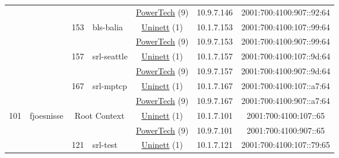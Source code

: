 \begin{small}
\begin{center}
\begin{longtable}{|c|c|c|c|c|c|c|c|}
  &  &  &  & \multicolumn{2}{|c|}{\tiny{\href{http://www.powertech.no}{PowerTech} (9)}} & \tiny{10.9.7.146} & \tiny{2001:700:4100:907::92:64} \\* \cline{3-3}\cline{4-4}\cline{5-5}\cline{6-6}\cline{7-7}\cline{8-8}
  &  & \multirow{2}{*}{\tiny{153}} & \multicolumn{1}{|l|}{\multirow{2}{*}{\tiny{bls-balia}}} & \multicolumn{2}{|c|}{\tiny{\href{https://www.uninett.no}{Uninett} (1)}} & \tiny{10.1.7.153} & \tiny{2001:700:4100:107::99:64} \\* \cline{5-5}\cline{6-6}\cline{7-7}\cline{8-8}
  &  &  &  & \multicolumn{2}{|c|}{\tiny{\href{http://www.powertech.no}{PowerTech} (9)}} & \tiny{10.9.7.153} & \tiny{2001:700:4100:907::99:64} \\* \cline{3-3}\cline{4-4}\cline{5-5}\cline{6-6}\cline{7-7}\cline{8-8}
  &  & \multirow{2}{*}{\tiny{157}} & \multicolumn{1}{|l|}{\multirow{2}{*}{\tiny{srl-seattle}}} & \multicolumn{2}{|c|}{\tiny{\href{https://www.uninett.no}{Uninett} (1)}} & \tiny{10.1.7.157} & \tiny{2001:700:4100:107::9d:64} \\* \cline{5-5}\cline{6-6}\cline{7-7}\cline{8-8}
  &  &  &  & \multicolumn{2}{|c|}{\tiny{\href{http://www.powertech.no}{PowerTech} (9)}} & \tiny{10.9.7.157} & \tiny{2001:700:4100:907::9d:64} \\* \cline{3-3}\cline{4-4}\cline{5-5}\cline{6-6}\cline{7-7}\cline{8-8}
  &  & \multirow{2}{*}{\tiny{167}} & \multicolumn{1}{|l|}{\multirow{2}{*}{\tiny{srl-mptcp}}} & \multicolumn{2}{|c|}{\tiny{\href{https://www.uninett.no}{Uninett} (1)}} & \tiny{10.1.7.167} & \tiny{2001:700:4100:107::a7:64} \\* \cline{5-5}\cline{6-6}\cline{7-7}\cline{8-8}
  &  &  &  & \multicolumn{2}{|c|}{\tiny{\href{http://www.powertech.no}{PowerTech} (9)}} & \tiny{10.9.7.167} & \tiny{2001:700:4100:907::a7:64} \\ \hline
 \multirow{16}{*}{\tiny{101}} & \multicolumn{1}{|l|}{\multirow{16}{*}{\tiny{fjoesnisse}}} & \multicolumn{2}{|c|}{\multirow{2}{*}{\tiny{Root Context}}} & \multicolumn{2}{|c|}{\tiny{\href{https://www.uninett.no}{Uninett} (1)}} & \tiny{10.1.7.101} & \tiny{2001:700:4100:107::65} \\* \cline{5-5}\cline{6-6}\cline{7-7}\cline{8-8}
  &  & \multicolumn{2}{|c|}{} & \multicolumn{2}{|c|}{\tiny{\href{http://www.powertech.no}{PowerTech} (9)}} & \tiny{10.9.7.101} & \tiny{2001:700:4100:907::65} \\* \cline{3-3}\cline{4-4}\cline{5-5}\cline{6-6}\cline{7-7}\cline{8-8}
  &  & \multirow{2}{*}{\tiny{121}} & \multicolumn{1}{|l|}{\multirow{2}{*}{\tiny{srl-test}}} & \multicolumn{2}{|c|}{\tiny{\href{https://www.uninett.no}{Uninett} (1)}} & \tiny{10.1.7.121} & \tiny{2001:700:4100:107::79:65} \\* \cline{5-5}\cline{6-6}\cline{7-7}\cline{8-8}

\end{longtable}
\end{center}
\end{small}
